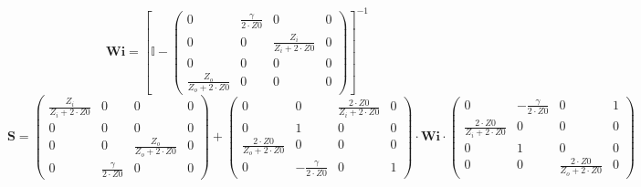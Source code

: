 \[ \mathbf{Wi} =  \left[ \mathbb{I}  - \left(\begin{smallmatrix} 0 & \frac{\gamma }{2\cdot Z0} & 0 & 0 \\ 0 & 0 & \frac{Z_i}{Z_i+2\cdot Z0} & 0 \\ 0 & 0 & 0 & 0 \\ \frac{Z_o}{Z_o+2\cdot Z0} & 0 & 0 & 0 \end{smallmatrix}\right) \right]^{-1}  \]
\[ \mathbf{S} = \left(\begin{smallmatrix} \frac{Z_i}{Z_i+2\cdot Z0} & 0 & 0 & 0 \\ 0 & 0 & 0 & 0 \\ 0 & 0 & \frac{Z_o}{Z_o+2\cdot Z0} & 0 \\ 0 & \frac{\gamma }{2\cdot Z0} & 0 & 0 \end{smallmatrix}\right) + \left(\begin{smallmatrix} 0 & 0 & \frac{2\cdot Z0}{Z_i+2\cdot Z0} & 0 \\ 0 & 1 & 0 & 0 \\ \frac{2\cdot Z0}{Z_o+2\cdot Z0} & 0 & 0 & 0 \\ 0 & -\frac{\gamma }{2\cdot Z0} & 0 & 1 \end{smallmatrix}\right) \cdot \mathbf{Wi} \cdot\left(\begin{smallmatrix} 0 & -\frac{\gamma }{2\cdot Z0} & 0 & 1 \\ \frac{2\cdot Z0}{Z_i+2\cdot Z0} & 0 & 0 & 0 \\ 0 & 1 & 0 & 0 \\ 0 & 0 & \frac{2\cdot Z0}{Z_o+2\cdot Z0} & 0 \end{smallmatrix}\right) \]
